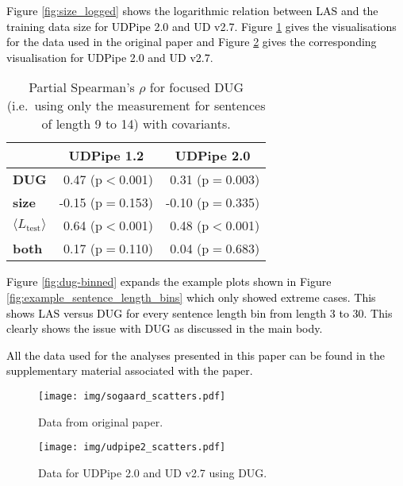 \documentclass[11pt,a4paper]{article}
\newcommand{\MTL}{{$\langle L_{\textrm{test}}\rangle$}}
\begin{document}
\textcolor{black}{Figure \ref{fig:size_logged} shows the logarithmic relation between LAS and the training data size for UDPipe 2.0 and UD v2.7. Figure \ref{fig:sogaard_scatters} gives the visualisations for the data used in the original paper and Figure \ref{fig:udpipe2_scatters} gives the corresponding visualisation for UDPipe 2.0 and UD v2.7}.


\begin{table}[tb!]
    \centering
    \small
    \begin{tabular}{lrr}
    \toprule
\multicolumn{1}{c}{} & \multicolumn{1}{c}{UDPipe 1.2} & \multicolumn{1}{c}{UDPipe 2.0}  \\
\midrule
\textbf{DUG} & 0.47 (p$<$0.001)  &  0.31 (p$=$0.003)   \\\midrule
\textbf{size}& -0.15 (p$=$0.153)  & -0.10 (p$=$0.335)  \\
\textbf{\MTL} & 0.64 (p$<$0.001) & 0.48 (p$<$0.001) \\
\textbf{both} & 0.17 (p$=$0.110) & 0.04 (p$=$0.683)  \\
\bottomrule
    \end{tabular}
    \caption{Partial Spearman's $\rho$ for focused DUG (i.e.\ using only the measurement for sentences of length 9 to 14) with covariants.}
    \label{tab:partial_correlations-focused}
\end{table}
\textcolor{black}{Figure \ref{fig:dug-binned} expands the example plots shown in Figure \ref{fig:example_sentence_length_bins} which only showed extreme cases. This shows LAS versus DUG for every sentence length bin from length 3 to 30. This clearly shows the issue with DUG as discussed in the main body.}

\textcolor{black}{All the data used for the analyses presented in this paper can be found in the supplementary material associated with the paper.}
\begin{figure*}[t!]
\centering
\begin{subfigure}
    \centering
    \texttt{[image: img/sogaard\_scatters.pdf]}
    \caption{Data from original paper.}
    \label{fig:sogaard_scatters}
\end{subfigure} %

\begin{subfigure} %
    \centering
    \texttt{[image: img/udpipe2\_scatters.pdf]}
    \caption{Data for UDPipe 2.0 and UD v2.7 using DUG.}
    \label{fig:udpipe2_scatters}
    \end{subfigure}     
\end{figure*}
\end{document}
